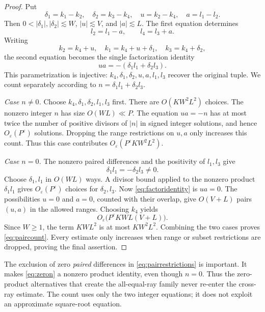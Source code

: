 \documentclass[11pt,reqno]{amsart}
\numberwithin{equation}{section}
\theoremstyle{definition}
\theoremstyle{remark}
\newcommand{\eps}{\varepsilon}
\begin{document}
\begin{proof}
Put
\begin{equation}\label{eq:pairparameters}
 \delta_1=k_1-k_2,\quad \delta_2=k_3-k_4,
 \quad u=k_2-k_4,\quad a=l_1-l_2.
\end{equation}
Then $0<|\delta_1|,|\delta_2|\lesssim W$, $|u|\lesssim V$, and $|a|\lesssim L$.
The first equation determines
\[
 l_2=l_1-a,\qquad l_4=l_3+a.
\]
Writing
\[
 k_2=k_4+u,\quad k_1=k_4+u+\delta_1,
 \quad k_3=k_4+\delta_2,
\]
the second equation becomes the single factorization identity
\begin{equation}\label{eq:factoridentity}
 ua=-(\delta_1l_1+\delta_2l_3).
\end{equation}
This parametrization is injective: $k_4,\delta_1,\delta_2,u,a,l_1,l_3$ recover the original tuple.
We count separately according to
$n=\delta_1l_1+\delta_2l_3$.

\smallskip
\noindent\emph{Case $n\ne0$.}
Choose $k_4,\delta_1,\delta_2,l_1,l_3$ first.
There are $O(KW^2L^2)$ choices.
The nonzero integer $n$ has size $O(WL)\ll P$.
The equation $ua=-n$ has at most twice the number of positive divisors of $|n|$ in signed integer solutions, and hence $O_\eps(P^\eps)$ solutions.
Dropping the range restrictions on $u,a$ only increases this count.
Thus this case contributes $O_\eps(P^\eps KW^2L^2)$.

\smallskip
\noindent\emph{Case $n=0$.}
The nonzero paired differences and the positivity of $l_1,l_3$ give
\begin{equation}\label{eq:zeron}
 \delta_1l_1=-\delta_2l_3\ne0.
\end{equation}
Choose $\delta_1,l_1$ in $O(WL)$ ways.
A divisor bound applied to the nonzero product $\delta_1l_1$ gives
$O_\eps(P^\eps)$ choices for $\delta_2,l_3$.
Now \eqref{eq:factoridentity} is $ua=0$.
The possibilities $u=0$ and $a=0$, counted with their overlap, give $O(V+L)$ pairs $(u,a)$ in the allowed ranges.
Choosing $k_4$ yields
\[
 O_\eps\bigl(P^\eps KWL(V+L)\bigr).
\]
Since $W\ge1$, the term $KWL^2$ is at most $KW^2L^2$.
Combining the two cases proves \eqref{eq:paircount}.
Every estimate only increases when range or subset restrictions are dropped, proving the final assertion.
\end{proof}

The exclusion of zero \emph{paired} differences in \eqref{eq:pairrestrictions} is important.
It makes \eqref{eq:zeron} a nonzero product identity, even though $n=0$.
Thus the zero-product alternatives that create the all-equal-ray family never re-enter the cross-ray estimate.
The count uses only the two integer equations; it does not exploit an approximate square-root equation.
\end{document}
